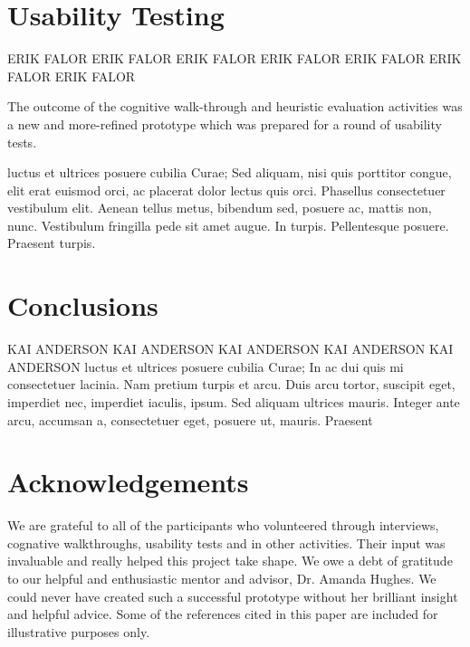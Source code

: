\documentclass{sigchi-ext}
\begin{document}
\section{Usability Testing}

ERIK FALOR ERIK FALOR ERIK FALOR ERIK FALOR ERIK FALOR ERIK FALOR ERIK FALOR

The outcome of the cognitive walk-through and heuristic evaluation activities was a new and
more-refined prototype which was prepared for a round of usability tests.


luctus et ultrices posuere cubilia Curae; Sed aliquam, nisi quis
porttitor congue, elit erat euismod orci, ac placerat dolor lectus quis
orci. Phasellus consectetuer vestibulum elit. Aenean tellus metus,
bibendum sed, posuere ac, mattis non, nunc. Vestibulum fringilla pede
sit amet augue. In turpis. Pellentesque posuere. Praesent turpis.



\section{Conclusions}
KAI ANDERSON KAI ANDERSON KAI ANDERSON KAI ANDERSON KAI ANDERSON
luctus et ultrices posuere cubilia Curae; In ac dui quis mi
consectetuer lacinia.
Nam pretium turpis et arcu. Duis arcu tortor, suscipit eget, imperdiet
nec, imperdiet iaculis, ipsum. Sed aliquam ultrices mauris. Integer
ante arcu, accumsan a, consectetuer eget, posuere ut, mauris. Praesent



\section{Acknowledgements}
We are grateful to all of the participants who volunteered through interviews,
cognative walkthroughs, usability tests and in other activities. Their input
was invaluable and really helped this project take shape.
We owe a debt of gratitude to our helpful and enthusiastic mentor and advisor,
Dr. Amanda Hughes. We could never have created such a successful prototype
without her brilliant insight and helpful advice.
Some of the references cited in this paper are included for illustrative purposes only.



\balance{} 

% 

% 

\end{document}
